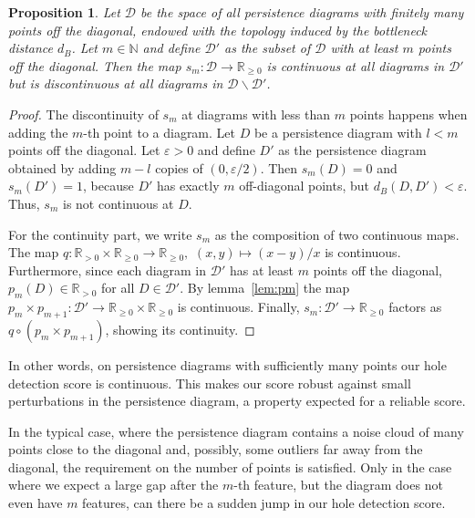 \documentclass{article}
\theoremstyle{plain}
\newtheorem{proposition}[theorem]{Proposition}
\theoremstyle{definition}
\theoremstyle{remark}
\begin{document}
\begin{proposition}
    Let $\mathcal{D}$ be the space of all persistence diagrams with finitely many points off the diagonal, endowed with the topology induced by the bottleneck distance $d_B$. Let $m \in \mathbb{N}$ and define $\mathcal{D}'$ as the subset of $\mathcal{D}$ with at least $m$ points off the diagonal. Then the map $s_m: \mathcal{D} \to \mathbb{R}_{\geq 0}$ is continuous at all diagrams in $\mathcal{D'}$ but is discontinuous at all diagrams in $\mathcal{D}\backslash \mathcal{D'}$.
\end{proposition}
\begin{proof}
    The discontinuity of  $s_m$ at diagrams with less than $m$ points happens when adding the $m$-th point to a diagram. Let $D$ be a persistence diagram with $l<m$ points off the diagonal. Let $\varepsilon >0$ and define $D'$ as the persistence diagram obtained by adding $m-l$ copies of $(0,\varepsilon/2)$. Then $s_m(D) = 0$ and $s_m(D') = 1$, because $D'$ has exactly $m$ off-diagonal points, but $d_B(D, D')< \varepsilon$. Thus, $s_m$ is not continuous at $D$.

    For the continuity part, we write $s_m$ as the composition of two continuous maps. The map \mbox{$q: \mathbb{R}_{>0} \times \mathbb{R}_{\geq 0} \to \mathbb{R}_{\geq 0},$} \mbox{$(x, y) \mapsto (x-y)/x$} is continuous. Furthermore, since each diagram in $\mathcal{D}'$ has at least $m$ points off the diagonal, $p_m(D) \in \mathbb{R}_{>0}$ for all $D\in \mathcal{D}'$. 
    By lemma~\ref{lem:pm} the map \mbox{$p_m\times p_{m+1}:\mathcal{D}'\to \mathbb{R}_{\geq 0} \times \mathbb{R}_{\geq 0}$} is continuous.
    Finally, $s_m: \mathcal{D}' \to \mathbb{R}_{\geq 0}$ factors as $q\circ (p_m\times p_{m+1})$, showing its continuity.
\end{proof}

In other words, on persistence diagrams with sufficiently many points our hole detection score is continuous. This makes our score robust against small perturbations in the persistence diagram, a property expected for a reliable score.

In the typical case, where the persistence diagram contains a noise cloud of many points close to the diagonal and, possibly, some outliers far away from the diagonal, the requirement on the number of points is satisfied. Only in the case where we expect a large gap after the $m$-th feature, but the diagram does not even have $m$ features, can there be a sudden jump in our hole detection score.
\end{document}

